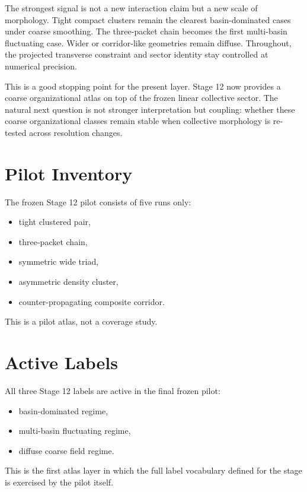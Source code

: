 \documentclass[11pt]{article}
\begin{document}
The strongest signal is not a new interaction claim but a new scale of morphology. Tight compact clusters remain the clearest basin-dominated cases under coarse smoothing. The three-packet chain becomes the first multi-basin fluctuating case. Wider or corridor-like geometries remain diffuse. Throughout, the projected transverse constraint and sector identity stay controlled at numerical precision.

This is a good stopping point for the present layer. Stage 12 now provides a coarse organizational atlas on top of the frozen linear collective sector. The natural next question is not stronger interpretation but coupling: whether these coarse organizational classes remain stable when collective morphology is re-tested across resolution changes.

\appendix
\section{Pilot Inventory}
The frozen Stage 12 pilot consists of five runs only:
\begin{itemize}
\item tight clustered pair,
\item three-packet chain,
\item symmetric wide triad,
\item asymmetric density cluster,
\item counter-propagating composite corridor.
\end{itemize}
This is a pilot atlas, not a coverage study.

\section{Active Labels}
All three Stage 12 labels are active in the final frozen pilot:
\begin{itemize}
\item basin-dominated regime,
\item multi-basin fluctuating regime,
\item diffuse coarse field regime.
\end{itemize}
This is the first atlas layer in which the full label vocabulary defined for the stage is exercised by the pilot itself.
\end{document}
